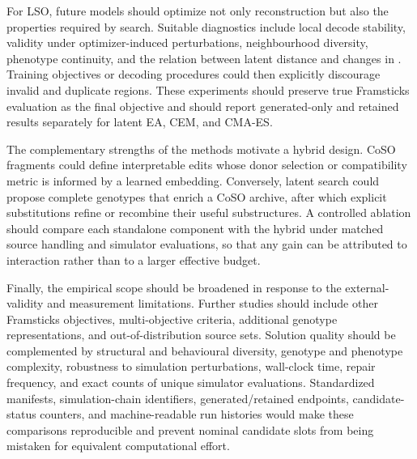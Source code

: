 For LSO, future models should optimize not only reconstruction but also the properties required by search. Suitable diagnostics include local decode stability, validity under optimizer-induced perturbations, neighbourhood diversity, phenotype continuity, and the relation between latent distance and changes in \vertpos{}. Training objectives or decoding procedures could then explicitly discourage invalid and duplicate regions. These experiments should preserve true Framsticks evaluation as the final objective and should report generated-only and retained results separately for latent EA, CEM, and CMA-ES.

The complementary strengths of the methods motivate a hybrid design. CoSO fragments could define interpretable edits whose donor selection or compatibility metric is informed by a learned embedding. Conversely, latent search could propose complete genotypes that enrich a CoSO archive, after which explicit substitutions refine or recombine their useful substructures. A controlled ablation should compare each standalone component with the hybrid under matched source handling and simulator evaluations, so that any gain can be attributed to interaction rather than to a larger effective budget.

Finally, the empirical scope should be broadened in response to the external-validity and measurement limitations. Further studies should include other Framsticks objectives, multi-objective criteria, additional genotype representations, and out-of-distribution source sets. Solution quality should be complemented by structural and behavioural diversity, genotype and phenotype complexity, robustness to simulation perturbations, wall-clock time, repair frequency, and exact counts of unique simulator evaluations. Standardized manifests, simulation-chain identifiers, generated/retained endpoints, candidate-status counters, and machine-readable run histories would make these comparisons reproducible and prevent nominal candidate slots from being mistaken for equivalent computational effort.
